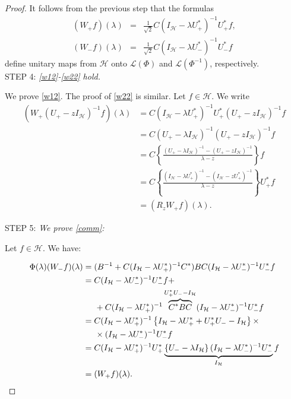 \documentclass[12pt]{amsart}
\theoremstyle{definition}
\theoremstyle{remark}
\numberwithin{equation}{section}
\begin{document}
\begin{proof}
    It follows from the previous step that the formulas
  \begin{eqnarray}
    (W_+f)(\lambda)&=&\frac{1}{\sqrt{2}}C(I_{\mathcal H}-\lambda U_+^*)^{-1}U_+^*f,\\
    (W_-f)(\lambda)&=&\frac{1}{\sqrt{2}}C(I_{\mathcal H}-\lambda U_-^*)^{-1}U_-^*f
  \end{eqnarray}
  define unitary maps from $\mathcal H$ onto $\mathcal L(\Phi)$ and $\mathcal L(\Phi^{-1})$, respectively.\\


  STEP 4: {\sl \eqref{w12}-\eqref{w22} hold.}\smallskip

  We prove \eqref{w12}. The proof of \eqref{w22} is similar. Let $f\in\mathcal H$. We write
  \[
    \begin{split}
     ( W_+(U_+-z I_{\mathcal H})^{-1}f)(\lambda)&=C(I_{\mathcal H}-\lambda U_+^*)^{-1}U_+^*(U_+-z I_{\mathcal H})^{-1}f\\
      &=C(U_+-\lambda I_{\mathcal H})^{-1}(U_+-z I_{\mathcal H})^{-1}f\\
      &=C\left\{\frac{(U_+-\lambda I_{\mathcal H})^{-1}-(U_+-z I_{\mathcal H})^{-1}}{\lambda-z}\right\}f\\
      &=C\left\{\frac{(I_{\mathcal H}-\lambda U_+^*)^{-1}-(I_{\mathcal H}-zU_+^*)^{-1}}{\lambda-z}\right\}U_+^*f\\
      &=(R_zW_+f)(\lambda).
    \end{split}
    \]


  STEP 5: {\sl We prove \eqref{comm}:}\smallskip

  Let $f\in\mathcal H$. We have:

  \[
    \begin{split}
      \Phi(\lambda)(W_-f)(\lambda)&=(B^{-1}+C(I_{\mathcal H}-\lambda U_+^*)^{-1}C^*)BC(I_{\mathcal H}-\lambda U_-^*)^{-1}U_-^*f\\
      &=C(I_{\mathcal H}-\lambda U_-^*)^{-1}U_-^*f+\\
      &\hspace{5mm}+C(I_{\mathcal H}-\lambda U_+^*)^{-1}\overbrace{C^*BC}^{U_+^*U_--I_{\mathcal H}}(I_{\mathcal H}-\lambda U_-^*)^{-1}U_-^*f\\
      &=C(I_{\mathcal H}-\lambda U_+^*)^{-1}\left\{I_{\mathcal H}-\lambda U_+^*+U_+^*U_--I_{\mathcal H}\right\}\times\\
      &\hspace{5mm}\times(I_{\mathcal H}-\lambda U_-^*)^{-1}U_-^*f\\
      &=C(I_{\mathcal H}-\lambda U_+^*)^{-1}U_+^*\underbrace{\left\{U_--\lambda I_{\mathcal H}\right\}(I_{\mathcal H}-\lambda U_-^*)^{-1}U_-^*}_{I_{\mathcal H}}f\\
      &=(W_+f)(\lambda).
    \end{split}
  \]
\end{proof}
\end{document}
